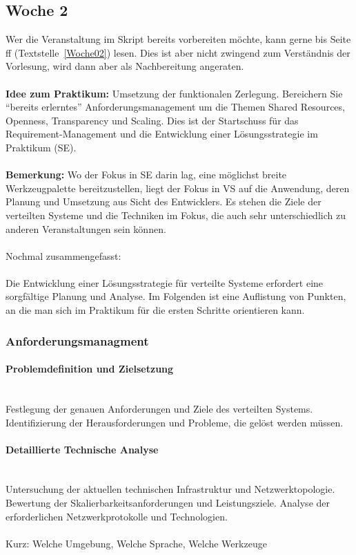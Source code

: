 \subsection{Woche 2}
Wer die Veranstaltung im Skript bereits vorbereiten möchte, kann gerne bis Seite \pageref{Woche02}ff (Textstelle~\ref{Woche02}) lesen. Dies ist aber nicht zwingend zum Verständnis der Vorlesung, wird dann aber als Nachbereitung angeraten.
\\\\
\textbf{Idee zum Praktikum:} Umsetzung der funktionalen Zerlegung. Bereichern Sie \enquote{bereits erlerntes} Anforderungsmanagement um die Themen Shared Resources, Openness, Transparency und Scaling. Dies ist der Startschuss für das Requirement-Management und die Entwicklung einer Lösungsstrategie im Praktikum (SE).
\\\\
\textbf{Bemerkung:} Wo der Fokus in SE darin lag, eine möglichst breite Werkzeugpalette bereitzustellen, liegt der Fokus in VS auf die Anwendung, deren Planung und Umsetzung aus Sicht des Entwicklers. Es stehen die Ziele der verteilten Systeme und die Techniken im Fokus, die auch sehr unterschiedlich zu anderen Veranstaltungen sein können.  \\\\
Nochmal zusammengefasst:
\\\\
Die Entwicklung einer Lösungsstrategie für verteilte Systeme erfordert eine sorgfältige Planung und Analyse. Im Folgenden ist eine Auflistung von Punkten, an die man sich im Praktikum für die ersten Schritte orientieren kann.

\subsubsection{Anforderungsmanagment}

\paragraph{Problemdefinition und Zielsetzung}
\mbox{}\\
Festlegung der genauen Anforderungen und Ziele des verteilten Systems.
Identifizierung der Herausforderungen und Probleme, die gelöst werden müssen.

\paragraph{Detaillierte Technische Analyse}
\mbox{}\\
Untersuchung der aktuellen technischen Infrastruktur und Netzwerktopologie.	Bewertung der Skalierbarkeitsanforderungen und Leistungsziele. Analyse der erforderlichen Netzwerkprotokolle und Technologien.
\\\\
Kurz: Welche Umgebung, Welche Sprache, Welche Werkzeuge
